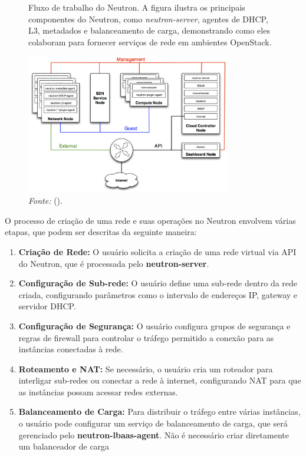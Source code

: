 \begin{figure}[htbp]
  \centering
  \caption{Fluxo de trabalho do Neutron. A figura ilustra os principais componentes do Neutron, como \textit{neutron-server}, agentes de DHCP, L3, metadados e balanceamento de carga, demonstrando como eles colaboram para fornecer serviços de rede em ambientes OpenStack.}
  \includegraphics[width=0.8\textwidth]{images/architecture_neutron.png}
  \caption*{\textit{Fonte:} (\cite{DocumentacaoOpenstack}).}
  \label{fig:neutron_architecture}
\end{figure}


O processo de criação de uma rede e suas operações no Neutron envolvem várias etapas, que podem ser descritas da seguinte maneira:

\begin{enumerate}
    \item \textbf{Criação de Rede:} O usuário solicita a criação de uma rede virtual via API do Neutron, que é processada pelo \textbf{neutron-server}.
    \item \textbf{Configuração de Sub-rede:} O usuário define uma sub-rede dentro da rede criada, configurando parâmetros como o intervalo de endereços IP, gateway e servidor DHCP.
    \item \textbf{Configuração de Segurança:} O usuário configura grupos de segurança e regras de firewall para controlar o tráfego permitido a conexão para as instâncias conectadas à rede.
    \item \textbf{Roteamento e NAT:} Se necessário, o usuário cria um roteador para interligar sub-redes ou conectar a rede à internet, configurando NAT para que as instâncias possam acessar redes externas.
    \item \textbf{Balanceamento de Carga:} Para distribuir o tráfego entre várias instâncias, o usuário pode configurar um serviço de balanceamento de carga, que será gerenciado pelo \textbf{neutron-lbaas-agent}. Não é necessário criar diretamente um balanceador de carga
\end{enumerate}

